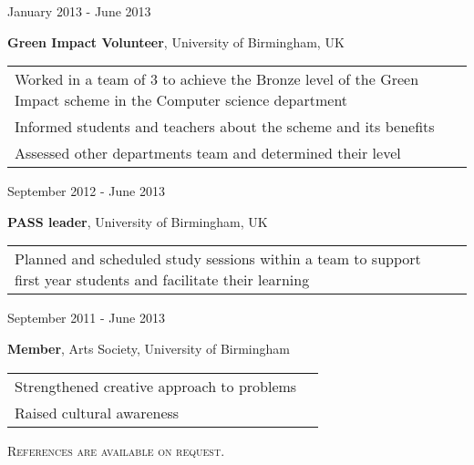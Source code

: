 \documentclass{article}
\newenvironment{changemargin}[2]{%
  \begin{list}{}{%
    \setlength{\topsep}{0pt}%
    \setlength{\leftmargin}{#1}%
    \setlength{\rightmargin}{#2}%
    \setlength{\listparindent}{\parindent}%
    \setlength{\itemindent}{\parindent}%
    \setlength{\parsep}{\parskip}%
  }%
  \item[]}{\end{list}
}
\newenvironment{body} {
	\vspace*{-16pt}
	\begin{changemargin}{0in}{0in}
  }	
	{
\end{changemargin}
\medskip
}
\newcommand{\paraW}[4]{
	\begin{minipage}[t]{0.6\textwidth}
	\textbf{#1}, #2, #3 \vspace{2pt}\\
	\begin{tabular}{p{10cm}l}
		#4
	\end{tabular}
	\end{minipage}
	\medskip
}
\newcommand{\timerange}[1]{
	\begin{minipage}[t]{0.30\textwidth}
		#1
	\end{minipage}
}
\begin{document}
\begin{body}
	\vspace{14pt}
	\timerange{January 2013 - June 2013}
	\paraW{Green Impact Volunteer}{University of Birmingham}{UK}{
		Worked in a team of 3 to achieve the Bronze level of the Green Impact scheme in the Computer science department\\
		Informed students and teachers about the scheme and its benefits\\
		Assessed other departments team and determined their level\\
	}
	
	\timerange{September 2012 - June 2013}
	\paraW{PASS leader}{University of Birmingham}{UK}{
		Planned and scheduled study sessions within a team to support first year students and facilitate their learning\\
	}
	
	\timerange{September 2011 - June 2013}
	\paraW{Member}{Arts Society}{University of Birmingham}{
		Strengthened creative approach to problems\\
		Raised cultural awareness\\
	}

\end{body}






\begin{changemargin}{-0.5in}{-0.5in}
		\vspace{-2pt}
		\scshape{ References are available on request.}
\end{changemargin}
\end{document}
